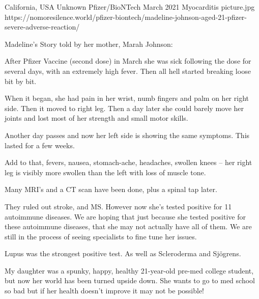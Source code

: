 {California, USA}
{Unknown}
{Pfizer/BioNTech}
{March 2021}
{Myocarditis}
{picture.jpg}
{https://nomoresilence.world/pfizer-biontech/madeline-johnson-aged-21-pfizer-severe-adverse-reaction/}
{

Madeline’s Story told by her mother, Marah Johnson:

After Pfizer Vaccine (second dose) in March she was sick following the dose for several days, with an extremely high fever. Then all hell started breaking loose bit by bit.

When it began, she had pain in her wrist, numb fingers and palm on her right side. Then it moved to right leg. Then a day later she could barely move her joints and lost most of her strength and small motor skills.

Another day passes and now her left side is showing the same symptoms. This lasted for a few weeks.

Add to that, fevers, nausea, stomach-ache, headaches, swollen knees – her right leg is visibly more swollen than the left with loss of muscle tone.

Many MRI’s and a CT scan have been done, plus a spinal tap later.

They ruled out stroke, and MS. However now she’s tested positive for 11 autoimmune diseases. We are hoping that just because she tested positive for these autoimmune diseases, that she may not actually have all of them. We are still in the process of seeing specialists to fine tune her issues.

Lupus was the strongest positive test. As well as Scleroderma and Sjögrens.

My daughter was a spunky, happy, healthy 21-year-old pre-med college student, but now her world has been turned upside down. She wants to go to med school so bad but if her health doesn’t improve it may not be possible!
}
